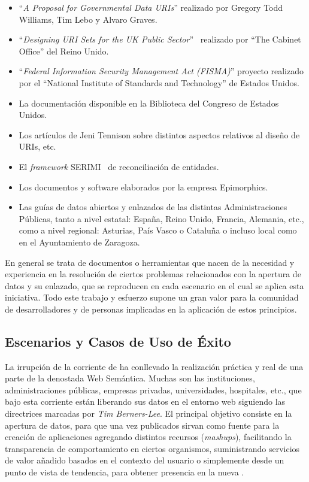 \begin{itemize}
 \item ``\textit{A Proposal for Governmental Data URIs}'' realizado por Gregory Todd Williams, Tim Lebo y Alvaro Graves.  %
 \item ``\textit{Designing \gls{URI} Sets for the UK Public Sector}''~\cite{uris-uk} realizado por ``The Cabinet Office'' del Reino Unido. 
 \item ``\textit{Federal Information Security Management Act (FISMA)}'' proyecto realizado por  el ``National Institute of Standards and Technology'' de Estados Unidos.
 \item La documentación disponible en la Biblioteca del Congreso de Estados Unidos.
 \item Los artículos de Jeni Tennison sobre distintos aspectos relativos al diseño de URIs, etc.
 \item El \textit{framework} SERIMI~\cite{Serimi} de reconciliación de entidades.
 \item Los documentos y software elaborados por la empresa Epimorphics.
 \item Las guías de datos abiertos y enlazados de las distintas Administraciones Públicas, tanto a nivel estatal: 
España, Reino Unido, Francia, Alemania, etc., como a nivel regional: Asturias, País Vasco o Cataluña o incluso local como
en el Ayuntamiento de Zaragoza.
\end{itemize}

En general se trata de documentos o herramientas que nacen de la necesidad y experiencia en la resolución de ciertos
 problemas relacionados con la apertura de datos y su enlazado, que se reproducen en cada escenario en el cual se
aplica esta iniciativa. Todo este trabajo y esfuerzo supone un gran valor para la comunidad de desarrolladores
y de personas implicadas en la aplicación de estos principios.

\subsection{Escenarios y Casos de Uso de Éxito}
La irrupción de la corriente de \linkeddata ha conllevado la realización práctica y real de una parte de la denostada Web
Semántica. Muchas son las instituciones, administraciones públicas,
empresas privadas, universidades, hospitales, etc., que bajo esta corriente están
liberando sus datos en el entorno web siguiendo las directrices  marcadas por
\textit{Tim Berners-Lee}. El principal objetivo consiste en la apertura de datos, para que
una vez publicados sirvan como fuente para la creación de aplicaciones agregando
distintos recursos (\textit{mashups}), facilitando la transparencia de comportamiento en
ciertos organismos, suministrando servicios de valor añadido basados en el contexto
del usuario o simplemente desde un punto de vista de tendencia, para obtener
presencia en la nueva \wod. 

